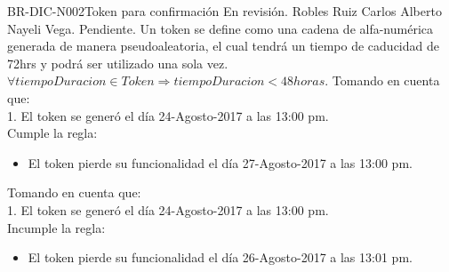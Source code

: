 \begin{BusinessRule}{BR-DIC-N002}{Token para confirmación}{\bcCondition}    %
	{\btEnabler}     %
	{\blControlling}    %
	\BRItem[Estado] En revisión.
	 Robles Ruiz Carlos Alberto
	 Nayeli Vega.
	 Pendiente.
	\BRItem[Descripción] Un token se define como una cadena de alfa-numérica generada de manera pseudoaleatoria, el cual tendrá un tiempo de caducidad de 72hrs y podrá ser utilizado una sola vez. 
	\BRItem[Sentencia] $\forall tiempoDuracion \in Token \Rightarrow tiempoDuracion < 48 horas.$
	\BRItem[Motivación] 
		Tomando en cuenta que:\\
			 1. El token se generó el día 24-Agosto-2017 a las 13:00 pm.\\ 
	Cumple la regla:
	\begin{itemize}
		\item El token pierde su funcionalidad el día 27-Agosto-2017 a las 13:00 pm.
	\end{itemize}
	Tomando en cuenta que:\\
			 1. El token se generó el día 24-Agosto-2017 a las 13:00 pm.\\ 
	Incumple la regla:
	\begin{itemize}
		\item El token pierde su funcionalidad el día 26-Agosto-2017 a las 13:01 pm.
	\end{itemize}

\end{BusinessRule}

